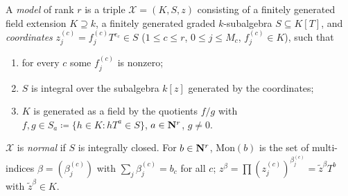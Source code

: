 \begin{definition}\label{def:gl-model}
\leanok
{}
A \emph{model} of rank $r$ is a triple $\mathcal X=(K,S,z)$ consisting of a finitely generated field extension
$K\supseteq k$, a finitely generated graded $k$-subalgebra $S\subseteq K[T]$, and \emph{coordinates}
$z^{(c)}_j=f^{(c)}_jT^{e_c}\in S$ ($1\le c\le r$, $0\le j\le M_c$, $f^{(c)}_j\in K$), such that
\begin{enumerate}
\item[(M1)] for every $c$ some $f^{(c)}_j$ is nonzero;
\item[(M2)] $S$ is integral over the subalgebra $k[z]$ generated by the coordinates;
\item[(M3)] $K$ is generated as a field by the quotients $f/g$ with $f,g\in S_a\coloneqq\{h\in K:hT^a\in S\}$,
$a\in\mathbf{N}^r$, $g\ne0$.
\end{enumerate}
$\mathcal X$ is \emph{normal} if $S$ is integrally closed. For $b\in\mathbf{N}^r$, $\mathrm{Mon}(b)$ is the set of multi-indices
$\beta=(\beta^{(c)}_j)$ with $\sum_j\beta^{(c)}_j=b_c$ for all $c$; $z^\beta=\prod(z^{(c)}_j)^{\beta^{(c)}_j}=\tilde z^\beta T^b$ with
$\tilde z^\beta\in K$.
\end{definition}

